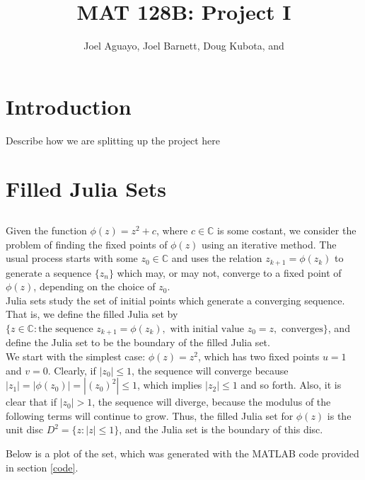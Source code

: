 \documentclass[12pt]{article}
\def\C{\mathbb{C}}
\begin{document}
	\title{MAT 128B: Project I}
	
	\author{Joel Aguayo, Joel Barnett, Doug Kubota, and }
	\maketitle
	
	\section{Introduction}
	Describe how we are splitting up the project here
	
	\section{Filled Julia Sets}
	\subsection{} 
	Given the function $\phi(z)=z^2+c$, where $c\in \C$ is some costant, we consider the problem of finding the fixed points of $\phi(z)$ using an iterative method. The usual process starts with some $z_0\in \C$ and uses the relation $z_{k+1}=\phi(z_k)$ to generate a sequence $\{z_n\}$ which may, or may not, converge to a fixed point of $\phi(z)$, depending on the choice of $z_0$. \\
	\newline
	Julia sets study the set of initial points which generate a converging sequence. That is, we define the filled Julia set by 
	$\{z\in \C: \text{the sequence } z_{k+1}=\phi(z_k), \text{ with initial value } z_0=z, \text{ converges}\}$, and define the Julia set to be the boundary of the filled Julia set. \\
	\newline
		We start with the simplest case: $\phi(z)=z^2$, which has two fixed points $u=1$ and $v=0$. Clearly, if $|z_0| \leq 1$, the sequence will converge because $|z_1|=|\phi(z_0)| = |(z_0)^2| \leq 1$, which implies $|z_2|\leq 1$ and so forth. Also, it is clear that if $|z_0|>1$, the sequence will diverge, because the modulus of the following terms will continue to grow. Thus, the filled Julia set for $\phi(z)$ is the unit disc $D^2=\{z: |z|\leq 1\}$, and the Julia set is the boundary of this disc. 
		
	Below is a plot of the set, which was generated with the MATLAB code provided in section \ref{code}.
	
\end{document}
